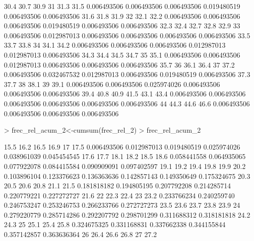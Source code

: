 \documentclass[a4paper]{article}
\begin{document}
\begin{Schunk}
\begin{Soutput}
       30.4        30.7        30.9          31        31.3        31.5 
0.006493506 0.006493506 0.006493506 0.019480519 0.006493506 0.006493506 
       31.6        31.8        31.9          32        32.1        32.2 
0.006493506 0.006493506 0.006493506 0.019480519 0.006493506 0.006493506 
       32.3        32.4        32.7        32.8        32.9          33 
0.006493506 0.012987013 0.006493506 0.006493506 0.006493506 0.006493506 
       33.5        33.7        33.8          34        34.1        34.2 
0.006493506 0.006493506 0.006493506 0.012987013 0.012987013 0.006493506 
       34.3        34.4        34.5        34.7          35        35.1 
0.006493506 0.006493506 0.012987013 0.006493506 0.006493506 0.006493506 
       35.7          36        36.1        36.4          37        37.2 
0.006493506 0.032467532 0.012987013 0.006493506 0.019480519 0.006493506 
       37.3        37.7          38        38.1          39        39.1 
0.006493506 0.006493506 0.025974026 0.006493506 0.006493506 0.006493506 
       39.4        40.8        40.9        41.5        43.1        43.4 
0.006493506 0.006493506 0.006493506 0.006493506 0.006493506 0.006493506 
         44        44.3        44.6        46.6 
0.006493506 0.006493506 0.006493506 0.006493506 
\end{Soutput}
\begin{Sinput}
> frec_rel_acum_2<-cumsum(frec_rel_2)
> frec_rel_acum_2
\end{Sinput}
\begin{Soutput}
       15.5        16.2        16.5        16.9          17        17.5 
0.006493506 0.012987013 0.019480519 0.025974026 0.038961039 0.045454545 
       17.6        17.7        18.1        18.2        18.5        18.6 
0.058441558 0.064935065 0.077922078 0.084415584 0.090909091 0.097402597 
       19.1        19.2        19.4        19.8        19.9        20.2 
0.103896104 0.123376623 0.136363636 0.142857143 0.149350649 0.175324675 
       20.3        20.5        20.6        20.8        21.1        21.5 
0.181818182 0.194805195 0.207792208 0.214285714 0.220779221 0.227272727 
       21.6          22        22.3        22.4          23        23.2 
0.233766234 0.240259740 0.246753247 0.253246753 0.266233766 0.272727273 
       23.5        23.6        23.7        23.8        23.9          24 
0.279220779 0.285714286 0.292207792 0.298701299 0.311688312 0.318181818 
       24.2        24.3          25        25.1        25.4        25.8 
0.324675325 0.331168831 0.337662338 0.344155844 0.357142857 0.363636364 
         26        26.4        26.6        26.8          27        27.2 

\end{Soutput}
\end{Schunk}
\end{document}
